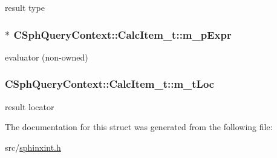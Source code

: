 result type 

\hypertarget{structCSphQueryContext_1_1CalcItem__t_ab43f4c6e05f47dade4f042a77016af4f}{
\subsubsection[{m\-\_\-p\-Expr}]{$\ast$ C\-Sph\-Query\-Context\-::\-Calc\-Item\-\_\-t\-::m\-\_\-p\-Expr}}\label{structCSphQueryContext_1_1CalcItem__t_ab43f4c6e05f47dade4f042a77016af4f}


evaluator (non-\/owned) 

\hypertarget{structCSphQueryContext_1_1CalcItem__t_a3d222a3adb204a33585116222ddbabed}{
\subsubsection[{m\-\_\-t\-Loc}]{ C\-Sph\-Query\-Context\-::\-Calc\-Item\-\_\-t\-::m\-\_\-t\-Loc}}\label{structCSphQueryContext_1_1CalcItem__t_a3d222a3adb204a33585116222ddbabed}


result locator 



The documentation for this struct was generated from the following file\-:\begin{DoxyCompactItemize}
\item 
src/\hyperlink{sphinxint_8h}{sphinxint.\-h}\end{DoxyCompactItemize}
